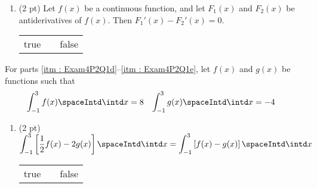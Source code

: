 


\begin{enumerate}[resume,label=(\alph*)]
\item\label{itm : Exam4P2Q1c} (2 pt) Let $f(x)$ be a continuous function, and let $F_{1}(x)$ and $F_{2}(x)$ be antiderivatives of $f(x)$. Then $F_{1}'(x) - F_{2}'(x) = 0$.
\begin{center}
\begin{tabular}{c c c}
true	&	\hspace{1in}	&	false
\end{tabular}
\end{center}
\end{enumerate}




\noindent{}For parts \ref{itm : Exam4P2Q1d}--\ref{itm : Exam4P2Q1e}, let $f(x)$ and $g(x)$ be functions such that
\begin{align*}
\int_{-1}^{3} f(x) \spaceIntd \intd x
&=
8
&
\int_{-1}^{3} g(x) \spaceIntd \intd x
&=
-4
\end{align*}



\begin{enumerate}[resume,label=(\alph*)]
\item\label{itm : Exam4P2Q1d} (2 pt) $\displaystyle\int_{-1}^{3} \left[\frac{1}{2} f(x) - 2 g(x)\right] \spaceIntd \intd x = \int_{-1}^{3} \left[f(x) - g(x)\right] \spaceIntd \intd x$
\begin{center}
\begin{tabular}{c c c}
true	&	\hspace{1in}	&	false
\end{tabular}
\end{center}
\end{enumerate}




